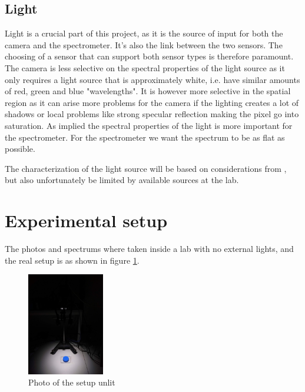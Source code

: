 \subsection{Light}
Light is a crucial part of this project, as it is the source of input for both the camera and the spectrometer. It's also the link between the two sensors. The choosing of a sensor that can support both sensor types is therefore paramount. The camera is less selective on the spectral properties of the light source as it only requires a light source that is approximately white, i.e. have similar amounts of red, green and blue "wavelengths". It is however more selective in the spatial region as it can arise more problems for the camera if the lighting creates a lot of shadows or local problems like strong specular reflection making the pixel go into saturation. As implied the spectral properties of the light is more important for the spectrometer. For the spectrometer we want the spectrum to be as flat as possible. 

The characterization of the light source will be based on considerations from \cite{martinPracticalGuideMachine}, but also unfortunately be limited by available sources at the lab. %


\section{Experimental setup}
The photos and spectrums where taken inside a lab with no external lights, and the real setup is as shown in figure \ref{fig:picture_of_setup_unlit}. %

\begin{figure}[h]
    \centering
    \includegraphics[width=0.3\textwidth]{figures/picture_taking_in_the_dark}
    \caption{Photo of the setup unlit}
    \label{fig:picture_of_setup_unlit}
\end{figure}

